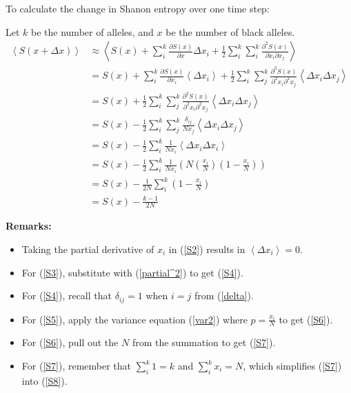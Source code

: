 \documentclass[12pt]{extarticle}
\newcommand{\<}{\langle}
\renewcommand{\>}{\rangle}
\theoremstyle{definition}
\begin{document}
\noindent To calculate the change in Shanon entropy over one time step:

\noindent Let $k$ be the number of alleles, and $x$ be the number of black alleles.
\begin{align}
    \left< S(x + \Delta x) \right> &\approx  \left<S(x) + \sum_i^k \frac{\partial S(x)}{\partial x}\Delta x_i + \frac{1}{2}\sum_i^k \sum_i^k \frac{\partial^2 S(x)}{\partial x_i \partial x_j} \right> \label{S1} \\
    &= S(x) + \sum_i^k \frac{\partial S(x)}{\partial x_i} \left< \Delta x_i \right> + \frac{1}{2}\sum_i^k \sum_j^k \frac{\partial^2 S(x)}{\partial^2 x_i \partial^2 x_j} \left< \Delta x_i \Delta x_j \right> \label{S2} \\
    &= S(x) + \frac{1}{2}\sum_i^k \sum_j^k \frac{\partial^2 S(x)}{\partial^2 x_i \partial^2 x_j} \left< \Delta x_i \Delta x_j \right> \label{S3} \\
    &= S(x) - \frac{1}{2}\sum_i^k \sum_j^k \frac{\delta_{ij}}{Nx_j} \left< \Delta x_i \Delta x_j \right> \label{S4} \\
    &= S(x) - \frac{1}{2}\sum_i^k \frac{1}{Nx_i} \left< \Delta x_i \Delta x_i \right> \label{S5} \\
    &= S(x) - \frac{1}{2}\sum_i^k \frac{1}{Nx_i} \left(N(\frac{x_i}{N})(1 - \frac{x_i}{N})\right) \label{S6} \\
    &= S(x) - \frac{1}{2N}\sum_i^k(1 - \frac{x_i}{N}) \label{S7} \\
    &= S(x) - \frac{k - 1}{2N} \label{S8}
\end{align}

\noindent \textbf{Remarks:}
\begin{itemize}
    \item Taking the partial derivative of $x_i$ in (\ref{S2}) results in $\left< \Delta x_i \right> = 0$.
    \item For (\ref{S3}), substitute with (\ref{partial^2}) to get (\ref{S4}).
    \item For (\ref{S4}), recall that $\delta_{ij} = 1$ when $i = j$ from (\ref{delta}).
    \item For (\ref{S5}), apply the variance equation (\ref{var2}) where $p = \frac{x_i}{N}$ to get (\ref{S6}).
    \item For (\ref{S6}), pull out the $N$ from the summation to get (\ref{S7}).
    \item For (\ref{S7}), remember that $\sum_i^k 1 = k$ and $\sum_i^k x_i = N$, which simplifies (\ref{S7}) into (\ref{S8}).
\end{itemize}
\end{document}

